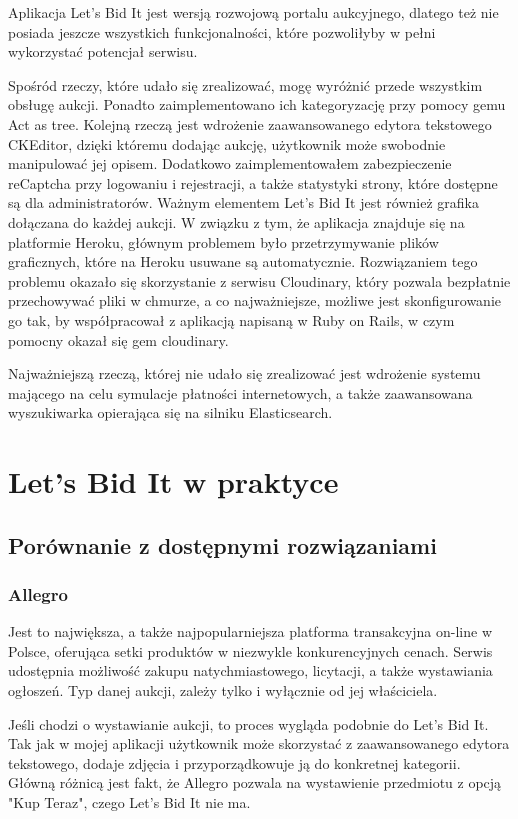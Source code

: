 \documentclass[brudnopis]{xmgr}
\begin{document}
Aplikacja Let's Bid It jest wersją rozwojową portalu aukcyjnego, dlatego też nie posiada jeszcze wszystkich funkcjonalności, które pozwoliłyby w pełni wykorzystać potencjał serwisu.

Spośród rzeczy, które udało się zrealizować, mogę wyróżnić przede wszystkim obsługę aukcji. Ponadto zaimplementowano ich kategoryzację przy pomocy gemu Act as tree. Kolejną rzeczą jest wdrożenie zaawansowanego edytora tekstowego CKEditor, dzięki któremu dodając aukcję, użytkownik może swobodnie manipulować jej opisem. Dodatkowo zaimplementowałem zabezpieczenie reCaptcha przy logowaniu i rejestracji, a także statystyki strony, które dostępne są dla administratorów. Ważnym elementem Let's Bid It jest również grafika dołączana do każdej aukcji. W związku z tym, że aplikacja znajduje się na platformie Heroku, głównym problemem było przetrzymywanie plików graficznych, które na Heroku usuwane są automatycznie. Rozwiązaniem tego problemu okazało się skorzystanie z serwisu Cloudinary, który pozwala bezpłatnie przechowywać pliki w chmurze, a co najważniejsze, możliwe jest skonfigurowanie go tak, by współpracował z aplikacją napisaną w Ruby on Rails, w czym pomocny okazał się gem cloudinary.

Najważniejszą rzeczą, której nie udało się zrealizować jest wdrożenie systemu mającego na celu symulacje płatności internetowych, a także zaawansowana wyszukiwarka opierająca się na silniku Elasticsearch.


\chapter{Let's Bid It w praktyce}

\section{Porównanie z dostępnymi rozwiązaniami}

\subsection{Allegro} 

Jest to największa, a także najpopularniejsza platforma transakcyjna on-line w Polsce, oferująca setki produktów w niezwykle konkurencyjnych cenach. Serwis udostępnia możliwość zakupu natychmiastowego, licytacji, a także wystawiania ogłoszeń. Typ danej aukcji, zależy tylko i wyłącznie od jej właściciela.

Jeśli chodzi o wystawianie aukcji, to proces wygląda podobnie do Let's Bid It. Tak jak w mojej aplikacji użytkownik może skorzystać z zaawansowanego edytora tekstowego, dodaje zdjęcia i przyporządkowuje ją do konkretnej kategorii. Główną różnicą jest fakt, że Allegro pozwala na wystawienie przedmiotu z opcją "Kup Teraz", czego Let's Bid It nie ma.
\end{document}
